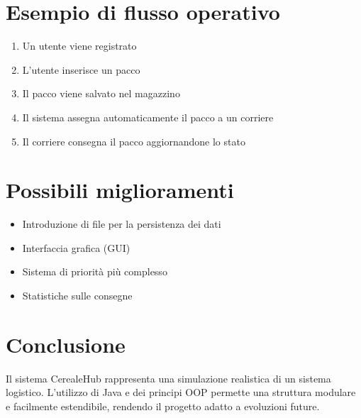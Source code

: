 \documentclass[a4paper,12pt]{article}
\begin{document}
\section{Esempio di flusso operativo}
\begin{enumerate}
    \item Un utente viene registrato
    \item L'utente inserisce un pacco
    \item Il pacco viene salvato nel magazzino
    \item Il sistema assegna automaticamente il pacco a un corriere
    \item Il corriere consegna il pacco aggiornandone lo stato
\end{enumerate}

\section{Possibili miglioramenti}
\begin{itemize}
    \item Introduzione di file per la persistenza dei dati
    \item Interfaccia grafica (GUI)
    \item Sistema di priorità più complesso
    \item Statistiche sulle consegne
\end{itemize}

\section{Conclusione}
Il sistema CerealeHub rappresenta una simulazione realistica di un sistema logistico. 
L'utilizzo di Java e dei principi OOP permette una struttura modulare e facilmente estendibile, 
rendendo il progetto adatto a evoluzioni future.
\end{document}
